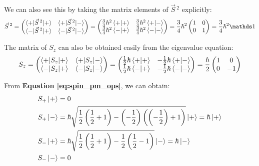 We can also see this by taking the matrix elements of $\vec{S}\,^2$ explicitly:
\begin{equation}
    \vec{S}\,^2 = \begin{pmatrix}
        \braket{+|\vec{S}\,^2|+} & \braket{+|\vec{S}\,^2|-} \\
        \braket{-|\vec{S}\,^2|+} & \braket{-|\vec{S}\,^2|-}
    \end{pmatrix} = \begin{pmatrix}
        \frac34\hbar^2\braket{+|+} & \frac34\hbar^2\braket{+|-} \\
        \frac34\hbar^2\braket{-|+} & \frac34\hbar^2\braket{-|-}
    \end{pmatrix} =\frac{3}{4}\hbar^2\begin{pmatrix}
        1 & 0 \\
        0 & 1
    \end{pmatrix} = \frac{3}{4}\hbar^2\Imat
\end{equation}

The matrix of $S_z$ can also be obtained easily from the eigenvalue equation:
\begin{equation}
    S_z = \begin{pmatrix}
        \braket{+|S_z|+} & \braket{+|S_z|-} \\
        \braket{-|S_z|+} & \braket{-|S_z|-}
    \end{pmatrix} = \begin{pmatrix}
        \frac12\hbar\braket{+|+} & -\frac12\hbar\braket{+|-} \\
        \frac12\hbar\braket{-|+} & -\frac12\hbar\braket{-|-}
    \end{pmatrix} =\frac{\hbar}{2}\begin{pmatrix}
        1 & 0 \\
        0 & -1
    \end{pmatrix}
\end{equation}

From \textbf{Equation \ref{eq:spin_pm_ops}}, we can obtain:
\begin{equation}
    \begin{split}
        S_+\ket{+} &= 0 \\
        S_+\ket{-} &= \hbar \sqrt{\frac12\left(\frac12+1\right)-\left(-\frac12\right)\left(\left(-\frac12\right)+1\right)}\ket{+} = \hbar\ket{+} \\
        S_-\ket{+} &= \hbar \sqrt{\frac12\left(\frac12+1\right)-\frac12\left(\frac12-1\right)}\ket{-} = \hbar\ket{-} \\
        S_-\ket{-} &= 0
    \end{split}
\end{equation}

